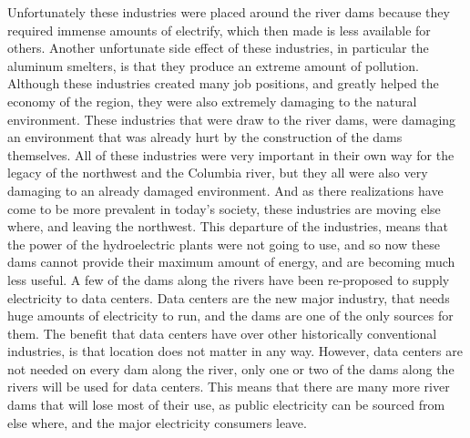 \documentclass[12pt,twoside]{article}
\begin{document}
Unfortunately these industries were placed around the river dams because they
required immense amounts of electrify, which then made is less available for
others. Another unfortunate side effect of these industries, in particular the
aluminum smelters, is that they produce an extreme amount of pollution.
Although these industries created many job positions, and greatly helped the
economy of the region, they were also extremely damaging to the natural
environment. These industries that were draw to the river dams, were damaging
an environment that was already hurt by the construction of the dams
themselves. All of these industries were very important in their own way for
the legacy of the northwest and the Columbia river, but they all were also very
damaging to an already damaged environment. And as there realizations have come
to be more prevalent in today's society, these industries are moving else
where, and leaving the northwest. This departure of the industries, means that
the power of the hydroelectric plants were not going to use, and so now these
dams cannot provide their maximum amount of energy, and are becoming much less
useful. A few of the dams along the rivers have been re-proposed to supply
electricity to data centers. Data centers are the new major industry, that
needs huge amounts of electricity to run, and the dams are one of the only
sources for them. The benefit that data centers have over other historically
conventional industries, is that location does not matter in any way. However,
data centers are not needed on every dam along the river, only one or two of
the dams along the rivers will be used for data centers. This means that there
are many more river dams that will lose most of their use, as public
electricity can be sourced from else where, and the major electricity consumers
leave.
\end{document}
